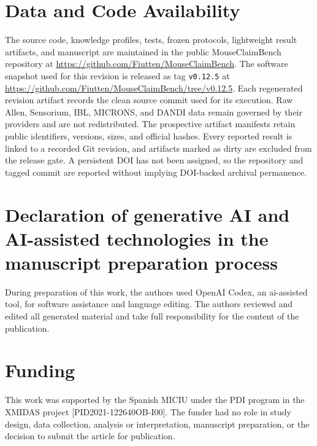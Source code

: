 \documentclass[review,12pt]{elsarticle}
\begin{document}
\section*{Data and Code Availability}
\label{sec:data-code-availability}
The source code, knowledge profiles, tests, frozen protocols, lightweight result artifacts, and manuscript are maintained in the public MouseClaimBench repository at \url{https://github.com/Fiutten/MouseClaimBench}. The software snapshot used for this revision is released as tag \texttt{v0.12.5} at \url{https://github.com/Fiutten/MouseClaimBench/tree/v0.12.5}. Each regenerated revision artifact records the clean source commit used for its execution. Raw Allen, Sensorium, IBL, MICRONS, and DANDI data remain governed by their providers and are not redistributed. The prospective artifact manifests retain public identifiers, versions, sizes, and official hashes. Every reported result is linked to a recorded Git revision, and artifacts marked as dirty are excluded from the release gate. A persistent DOI has not been assigned, so the repository and tagged commit are reported without implying DOI-backed archival permanence.

\section*{Declaration of generative AI and AI-assisted technologies in the manuscript preparation process}
\label{sec:generative-ai}
During preparation of this work, the authors used OpenAI Codex, an \ac{ai}-assisted tool, for software assistance and language editing. The authors reviewed and edited all generated material and take full responsibility for the content of the publication.

\section*{Funding}
\label{sec:funding}
This work was supported by the Spanish MICIU under the PDI program in the XMIDAS project [PID2021-122640OB-I00]. The funder had no role in study design, data collection, analysis or interpretation, manuscript preparation, or the decision to submit the article for publication.

\setlength{\bibsep}{0pt}


\end{document}
